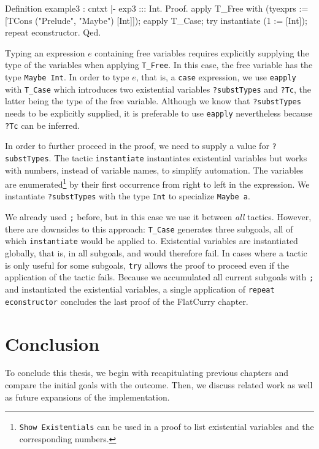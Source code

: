 \documentclass[paper = a4, fleqn, twoside]{scrreprt}
\begin{document}
\begin{coqcode}
Definition example3 : cntxt |- exp3 ::: Int.
  Proof.
  apply T_Free with (tyexprs := [TCons ("Prelude", "Maybe") [Int]]);
  eapply T_Case;
  try instantiate (1 := [Int]);
  repeat econstructor.
Qed.
\end{coqcode}
Typing an expression $e$ containing free variables requires explicitly supplying the type of the variables when applying \texttt{T\_Free}. In this case, the free variable has the type \texttt{Maybe Int}. In order to type $e$, that is, a \texttt{case} expression, we use \texttt{eapply} with \texttt{T\_Case} which introduces two existential variables \texttt{?substTypes} and \texttt{?Tc}, the latter being the type of the free variable. Although we know that \texttt{?substTypes} needs to be explicitly supplied, it is preferable to use \texttt{eapply} nevertheless because \texttt{?Tc} can be inferred.
\par
In order to further proceed in the proof, we need to supply a value for \texttt{?substTypes}. The tactic \texttt{instantiate} instantiates existential variables but works with numbers, instead of variable names, to simplify automation. The variables are enumerated\footnote{\texttt{Show Existentials} can be used in a proof to list existential variables and the corresponding numbers.} by their first occurrence from right to left in the expression. We instantiate \texttt{?substTypes} with the type \texttt{Int} to specialize \texttt{Maybe a}. 
\par
We already used \texttt{;} before, but in this case we use it between \textit{all} tactics. However, there are downsides to this approach: \texttt{T\_Case} generates three subgoals, all of which \texttt{instantiate} would be applied to. Existential variables are instantiated globally, that is, in all subgoals, and would therefore fail. In cases where a tactic is only useful for some subgoals, \texttt{try} allows the proof to proceed even if the application of the tactic fails. Because we accumulated all current subgoals with \texttt{;} and instantiated the existential variables, a single application of \texttt{repeat econstructor} concludes the last proof of the FlatCurry chapter.
\chapter{Conclusion}
To conclude this thesis, we begin with recapitulating previous chapters and compare the initial goals with the outcome. Then, we discuss related work as well as future expansions of the implementation.
\end{document}
